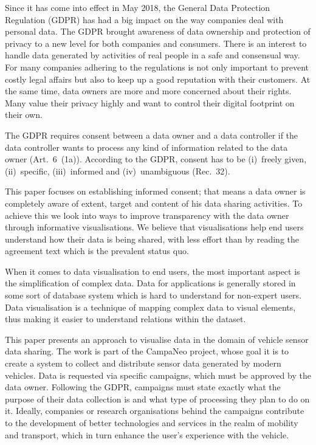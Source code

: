\documentclass[../paper.tex]{subfiles}
\begin{document}
  Since it has come into effect in May 2018, the General Data Protection
  Regulation (GDPR) has had a big impact on the way companies deal with
  personal data. The GDPR brought awareness of data ownership and protection
  of privacy to a new level for both companies and consumers. There is an
  interest to handle data generated by activities of real people in a safe and
  consensual way. For many companies adhering to the regulations is not only
  important to prevent costly legal affairs but also to keep up a good
  reputation with their customers. At the same time, data owners are more and
  more concerned about their rights. Many value their privacy highly and want
  to control their digital footprint on their own.

  The GDPR requires consent between a data owner and a data controller
  if the data controller wants to process any kind of information related to
  the data owner (Art.~6~(1a)). According to the GDPR, consent has to be
  (i)~freely given, (ii)~specific, (iii)~informed and (iv)~unambiguous (Rec.~32).

  This paper focuses on establishing informed consent; that means a data owner
  is completely aware of extent, target and content of his data sharing
  activities. To achieve this we look into ways to improve transparency with
  the data owner through informative visualisations. We believe that
  visualisations help end users understand how their data is being shared,
  with less effort than by reading the agreement text which is the prevalent
  status quo.

  When it comes to data visualisation to end users, the most important aspect
  is the simplification of complex data. %
  Data for applications is generally stored in some sort of database system
  which is hard to understand for non-expert users. Data visualisation is a
  technique of mapping complex data to visual elements, thus making it easier
  to understand relations within the dataset.

  This paper presents an approach to visualise data in the domain of vehicle
  sensor data sharing. The work is part of the CampaNeo project, whose goal
  it is to create a system to collect and distribute sensor data generated by
  modern vehicles. Data is requested via specific campaigns, which must be
  approved by the data owner. Following the GDPR, campaigns must state exactly
  what the purpose of their data collection is and what type of processing they
  plan to do on it. Ideally, companies or research organisations behind the
  campaigns contribute to the development of better technologies and services
  in the realm of mobility and transport, which in turn enhance the user’s
  experience with the vehicle.
\end{document}
